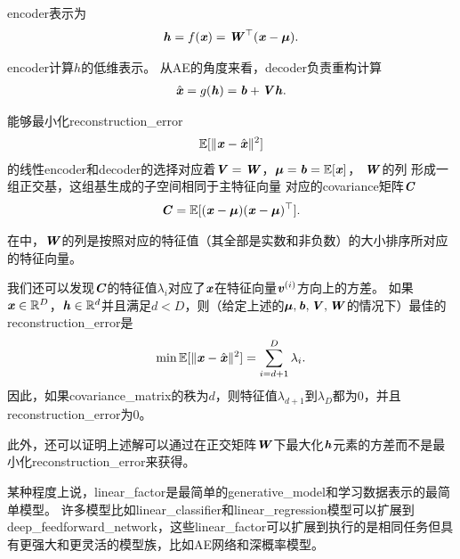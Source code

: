 \gls{encoder}表示为
\begin{align}
\label{eqn:1319}
\Vh  = f(\Vx) = \MW^{\top} (\Vx - \Vmu).
\end{align}


\gls{encoder}计算$h$的低维表示。
从\gls{AE}的角度来看，\gls{decoder}负责重构计算
\begin{align}
\label{eqn:1320}
\hat{\Vx} = g(\Vh) = \Vb + \MV \Vh.
\end{align}


能够最小化\gls{reconstruction_error}
\begin{align}
\label{eqn:1321}
\SetE[\Vert\Vx - \hat{\Vx}\Vert^2]
\end{align}
的线性\gls{encoder}和\gls{decoder}的选择对应着$\boldsymbol{\mathit{V}} = \boldsymbol{\mathit{W}}$，${\boldsymbol{\mu}} = \boldsymbol{\mathit{b}} = \mathbb{E}[\boldsymbol{\mathit{x}}]$， $\boldsymbol{\mathit{W}}$的列 形成一组正交基，这组基生成的子空间相同于主特征向量 对应的\gls{covariance}矩阵$\boldsymbol{\mathit{C}}$
\begin{align}
\label{eqn:1322}
\MC = \SetE[(\Vx - {\Vmu})(\Vx - {\Vmu})^{\top}].
\end{align}



在中，$\boldsymbol{\mathit{W}}$的列是按照对应的特征值（其全部是实数和非负数）的大小排序所对应的特征向量。

我们还可以发现$\boldsymbol{\mathit{C}}$的特征值$\lambda_i$对应了$\boldsymbol{\mathit{x}}$在特征向量$\boldsymbol{\mathit{v}}^{(i)}$方向上的方差。
如果$\boldsymbol{\mathit{x}}\in \mathbb{R}^D$，$\boldsymbol{\mathit{h}}\in\mathbb{R}^d$并且满足$d<D$，则（给定上述的${\boldsymbol{\mu}},\boldsymbol{\mathit{b}},\boldsymbol{\mathit{V}},\boldsymbol{\mathit{W}}$的情况下）最佳的\gls{reconstruction_error}是
\begin{align}
\label{eqn:1323}
\min \SetE[\Vert \Vx - \hat{\Vx} \Vert^2] = \sum_{i=d+1}^{D}\lambda_i.
\end{align}
因此，如果\gls{covariance_matrix}的秩为$d$，则特征值$\lambda_{d+1}$到$\lambda_{D}$都为$0$，并且\gls{reconstruction_error}为$0$。

此外，还可以证明上述解可以通过在正交矩阵$\boldsymbol{\mathit{W}}$下最大化$\boldsymbol{\mathit{h}}$元素的方差而不是最小化\gls{reconstruction_error}来获得。


某种程度上说，\gls{linear_factor}是最简单的\gls{generative_model}和学习数据表示的最简单模型。
许多模型比如\gls{linear_classifier}和\gls{linear_regression}模型可以扩展到\gls{deep_feedforward_network}，这些\gls{linear_factor}可以扩展到执行的是相同任务但具有更强大和更灵活的模型族，比如\gls{AE}网络和深概率模型。














